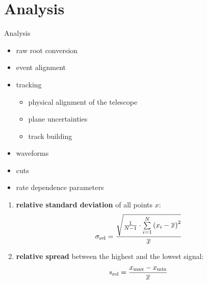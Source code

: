\section{Analysis}
\begin{frame}{Analysis}

  \begin{itemize}
    \item raw \ra root conversion
    \item event alignment
    \item tracking
    \begin{itemize}
      \item physical alignment of the telescope
      \item plane uncertainties
      \item track building
    \end{itemize}
    \item waveforms
    \item cuts
    \item rate dependence parameters
  \end{itemize}
  \begin{enumerate}
  \item \textbf{relative standard deviation} of all points $x$:
  \begin{equation}
    \sigma_\text{rel} = \frac{\sqrt{\frac{1}{N-1}\cdot\sum\limits_{i=1}^{N}{\left(x_i-\overline{x}\right)^2}}}{\overline{x}}
  \end{equation}
  \item \textbf{relative spread} between the highest and the lowest signal:
  \begin{equation}
    s_\text{rel} = \frac{x_\text{max} - x_\text{min}}{\overline{x}}
  \end{equation}

\end{enumerate}
  
\end{frame}
